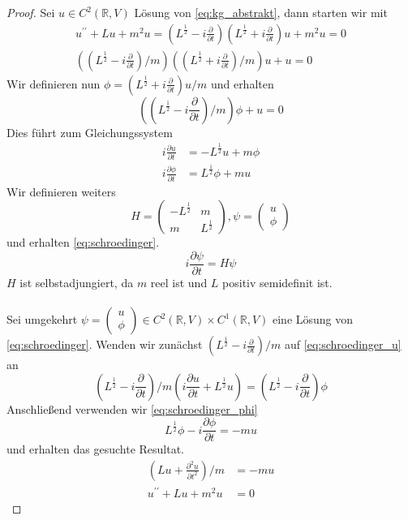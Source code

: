\documentclass[11pt,a4paper,leqno]{report}
\numberwithin{equation}{chapter}
\begin{document}
\begin{proof}
	Sei $u\in C^2(\mathbb{R}, V)$ Lösung von \eqref{eq:kg_abstrakt}, dann starten wir mit 
	\begin{align*}
		u^{\prime \prime} + Lu + m^2u=
		(L^\frac{1}{2} - i\frac{\partial}{\partial t})(L^\frac{1}{2} + i\frac{\partial}{\partial t})u + m^2 u=0\\
		((L^\frac{1}{2} - i\frac{\partial}{\partial t})/m)((L^\frac{1}{2} + i\frac{\partial}{\partial t})/m)u + u=0
	\end{align*}
	Wir definieren nun $\phi = (L^\frac{1}{2} + i \frac{\partial}{\partial t})u/m$ und erhalten
	\begin{equation*}
		((L^\frac{1}{2} - i\frac{\partial}{\partial t})/m)\phi + u=0
	\end{equation*}
	Dies f\"uhrt zum Gleichungssystem
	\begin{align}
		i \frac{\partial u}{\partial t} &= -L^\frac{1}{2}u + m\phi\label{eq:schroedinger_u}\\
		i\frac{\partial\phi}{\partial t}&=L^\frac{1}{2}\phi + mu\label{eq:schroedinger_phi}
	\end{align}
	 Wir definieren weiters
	 \begin{equation*}
	 	H=\begin{pmatrix}
	 		-L^\frac{1}{2} & m \\ 
	 		m & L^\frac{1}{2}
	 	\end{pmatrix}, \psi =\begin{pmatrix}
	 	u \\ \phi
 	\end{pmatrix}
	 \end{equation*}
	 und erhalten \eqref{eq:schroedinger}.
	 \begin{equation}
	 	i\frac{\partial\psi}{\partial t} = H\psi
	 \end{equation}
 	$H$ ist selbstadjungiert, da $m$ reel ist und $L$ positiv semidefinit ist.\\
 	\\
 	Sei umgekehrt $\psi =\begin{pmatrix} u \\ \phi\end{pmatrix}\in C^2(\mathbb{R},V)\times C^1(\mathbb{R},V)$ eine L\"osung von \eqref{eq:schroedinger}. Wenden wir zun\"achst  $(L^\frac{1}{2}-i \frac{\partial}{\partial t})/m$ auf \eqref{eq:schroedinger_u} an
 	\begin{equation*}
 		(L^\frac{1}{2}-i \frac{\partial}{\partial t})/m(i \frac{\partial u}{\partial t} + L^\frac{1}{2}u) = (L^\frac{1}{2}-i \frac{\partial}{\partial t})\phi
 	\end{equation*}
 	Anschlie\ss{}end verwenden wir \eqref{eq:schroedinger_phi} 
 	\begin{equation*}
 		L^\frac{1}{2}\phi - i\frac{\partial\phi}{\partial t} =-mu
 	\end{equation*}
 	und erhalten das gesuchte Resultat. 
 	\begin{align*}
 		(Lu+\frac{\partial^2u}{\partial t^2})/m &=-mu\\
 		u^{\prime\prime} + Lu+m^2 u&= 0
 	\end{align*}
\end{proof}
\end{document}
